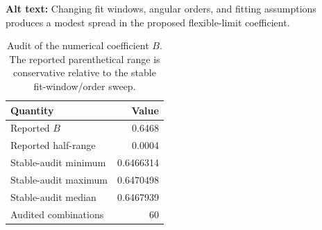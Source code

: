 \begin{table}[ht]
\centering
\caption{Audit of the numerical coefficient $B$.  The reported parenthetical range is conservative relative to the stable fit-window/order sweep.}
\par\raggedright\textbf{Alt text:} Changing fit windows, angular orders, and fitting assumptions produces a modest spread in the proposed flexible-limit coefficient.\par\centering

\label{tab:B_sensitivity}
\begin{tabular}{lr}
\toprule
Quantity & Value\\
\midrule
Reported $B$ & 0.6468\\
Reported half-range & 0.0004\\
Stable-audit minimum & 0.6466314\\
Stable-audit maximum & 0.6470498\\
Stable-audit median & 0.6467939\\
Audited combinations & 60\\
\bottomrule
\end{tabular}
\end{table}
